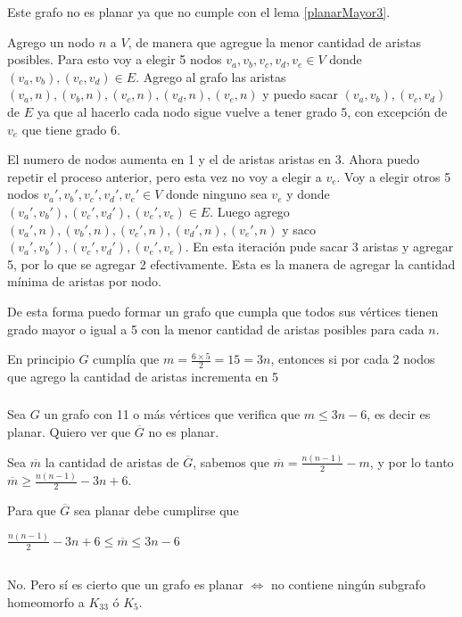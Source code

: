 Este grafo no es planar ya que no cumple con el lema \ref{planarMayor3}.

Agrego un nodo $n$ a $V$, de manera que agregue la menor cantidad de aristas posibles. Para esto voy a elegir 5 nodos $v_a, v_b, v_c, v_d, v_e \in V$ donde $(v_a, v_b), (v_c, v_d) \in E$. Agrego al grafo las aristas $(v_a, n), (v_b, n), (v_c, n), (v_d, n), (v_e, n)$ y puedo sacar $(v_a, v_b), (v_c, v_d)$ de $E$ ya que al hacerlo cada nodo sigue vuelve a tener grado 5, con excepción de $v_e$ que tiene grado 6.

El numero de nodos aumenta en 1 y el de aristas aristas en 3. Ahora puedo repetir el proceso anterior, pero esta vez no voy a elegir a $v_e$. Voy a elegir otros 5 nodos $v_a', v_b', v_c', v_d', v_e' \in V$ donde ninguno sea $v_e$ y donde $(v_a', v_b'), (v_c', v_d'), (v_e', v_e) \in E$. Luego agrego $(v_a', n), (v_b', n), (v_c', n), (v_d', n), (v_e', n)$ y saco $(v_a', v_b'), (v_c', v_d'), (v_e', v_e)$. En esta iteración pude sacar 3 aristas y agregar 5, por lo que se agregar 2 efectivamente. Esta es la manera de agregar la cantidad mínima de aristas por nodo.

De esta forma puedo formar un grafo que cumpla que todos sus vértices tienen grado mayor o igual a 5 con la menor cantidad de aristas posibles para cada $n$.

En principio $G$ cumplía que $m = \frac{6 \times 5}{2} = 15 = 3n$, entonces si por cada 2 nodos que agrego la cantidad de aristas incrementa en 5

\subsubsection{}
Sea $G$ un grafo con 11 o más vértices que verifica que $m \leq 3n - 6$, es decir es planar. Quiero ver que $\overline{G}$ no es planar.

Sea $\overline{m}$ la cantidad de aristas de $\overline{G}$, sabemos que $\overline{m} = \frac{n(n - 1)}{2} - m$, y por lo tanto $\overline{m} \geq \frac{n(n - 1)}{2} - 3n + 6$.

Para que $\overline{G}$ sea planar debe cumplirse que 

\begin{center}
    $\frac{n(n - 1)}{2} - 3n + 6 \leq \overline{m} \leq 3n - 6$



\end{center}

\subsection{}
No. Pero sí es cierto que un grafo es planar $\Longleftrightarrow$ no contiene ningún subgrafo homeomorfo a $K_{33}$ ó $K_5$.